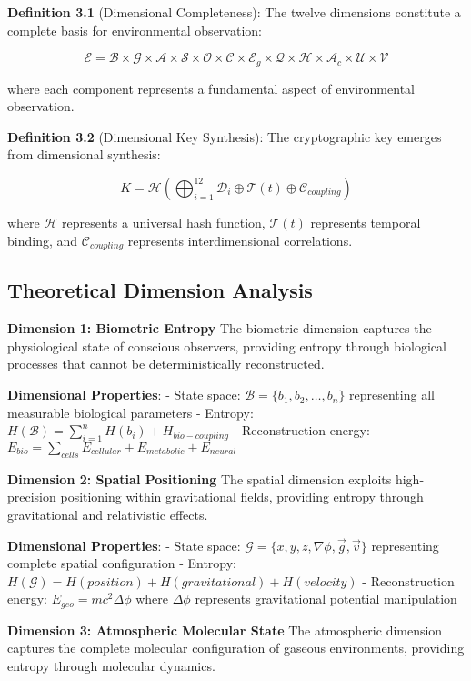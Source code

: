 \documentclass[12pt]{article}
\begin{document}
\textbf{Definition 3.1} (Dimensional Completeness): The twelve dimensions constitute a complete basis for environmental observation:

$$\mathcal{E} = \mathcal{B} \times \mathcal{G} \times \mathcal{A} \times \mathcal{S} \times \mathcal{O} \times \mathcal{C} \times \mathcal{E}_g \times \mathcal{Q} \times \mathcal{H} \times \mathcal{A}_c \times \mathcal{U} \times \mathcal{V}$$

where each component represents a fundamental aspect of environmental observation.

\textbf{Definition 3.2} (Dimensional Key Synthesis): The cryptographic key emerges from dimensional synthesis:

$$K = \mathcal{H}(\bigoplus_{i=1}^{12} \mathcal{D}_i \oplus \mathcal{T}(t) \oplus \mathcal{C}_{coupling})$$

where $\mathcal{H}$ represents a universal hash function, $\mathcal{T}(t)$ represents temporal binding, and $\mathcal{C}_{coupling}$ represents interdimensional correlations.

\subsection{Theoretical Dimension Analysis}

\textbf{Dimension 1: Biometric Entropy}
The biometric dimension captures the physiological state of conscious observers, providing entropy through biological processes that cannot be deterministically reconstructed.

\textbf{Dimensional Properties}:
- State space: $\mathcal{B} = \{b_1, b_2, \ldots, b_n\}$ representing all measurable biological parameters
- Entropy: $H(\mathcal{B}) = \sum_{i=1}^{n} H(b_i) + H_{bio-coupling}$
- Reconstruction energy: $E_{bio} = \sum_{cells} E_{cellular} + E_{metabolic} + E_{neural}$

\textbf{Dimension 2: Spatial Positioning}
The spatial dimension exploits high-precision positioning within gravitational fields, providing entropy through gravitational and relativistic effects.

\textbf{Dimensional Properties}:
- State space: $\mathcal{G} = \{x, y, z, \nabla \phi, \vec{g}, \vec{v}\}$ representing complete spatial configuration
- Entropy: $H(\mathcal{G}) = H(position) + H(gravitational) + H(velocity)$
- Reconstruction energy: $E_{geo} = mc^2 \Delta \phi$ where $\Delta \phi$ represents gravitational potential manipulation

\textbf{Dimension 3: Atmospheric Molecular State}
The atmospheric dimension captures the complete molecular configuration of gaseous environments, providing entropy through molecular dynamics.
\end{document}
